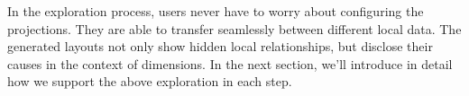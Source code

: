 In the exploration process, users never have to worry about configuring the projections. They are able to transfer seamlessly between different local data. The generated layouts not only show hidden local relationships, but disclose their causes in the context of dimensions.  In the next section, we'll introduce in detail how we support the above exploration in each step.
